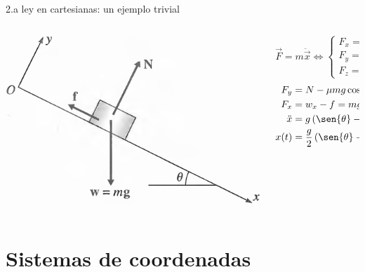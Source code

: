 \documentclass[serif]{beamer}
\begin{document}
\begin{frame}
\begin{block}{2.a ley en cartesianas: un ejemplo trivial}
\begin{columns}[c]
	\begin{column}{0.35\textwidth}
		\includegraphics[width=\textwidth]{taylor1_9}
	\end{column}
  \begin{column}{0.65\textwidth}
		\[
		\vec{F}= m \ddot{\vec{x}} \iff
		\begin{cases}
			F_x = m \ddot{x} \\
			F_y = m \ddot{y} \\
			F_z = m \ddot{z}
		\end{cases}
		\]
		\begin{align*}
			F_y &= N - \mu m g \cos{\theta} = 0\\
			F_x &= w_x- f = m g \sen{\theta} - \mu m g \cos{\theta} = m \ddot{x}\\
			\ddot{x} &= g \left(\sen{\theta} - \mu \cos{\theta}\right)\\
			x(t) &= \frac{g}{2} \left(\sen{\theta} - \mu \cos{\theta}\right) t^2 \quad [\dot{x}(0)=0, x(0)=0]
		\end{align*}
	\end{column}
\end{columns}
\end{block}
\end{frame}


\section{Sistemas de coordenadas}
\end{document}
